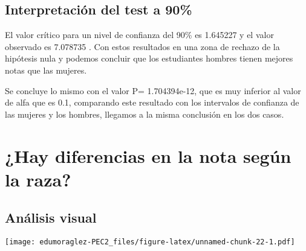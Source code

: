 \documentclass[
]{article}
\newenvironment{Shaded}{\begin{snugshade}}{\end{snugshade}}
\newcommand{\AttributeTok}[1]{\textcolor[rgb]{0.80,0.80,0.80}{#1}}
\newcommand{\ConstantTok}[1]{\textcolor[rgb]{0.86,0.64,0.64}{\textbf{#1}}}
\newcommand{\FunctionTok}[1]{\textcolor[rgb]{0.94,0.94,0.56}{#1}}
\newcommand{\NormalTok}[1]{\textcolor[rgb]{0.80,0.80,0.80}{#1}}
\newcommand{\OtherTok}[1]{\textcolor[rgb]{0.94,0.94,0.56}{#1}}
\newcommand{\SpecialCharTok}[1]{\textcolor[rgb]{0.86,0.64,0.64}{#1}}
\newcommand{\StringTok}[1]{\textcolor[rgb]{0.80,0.58,0.58}{#1}}
\begin{document}
\hypertarget{interpretaciuxf3n-del-test-a-90}{%
\subsection{Interpretación del test a
90\%}\label{interpretaciuxf3n-del-test-a-90}}

El valor crítico para un nivel de confianza del 90\% es 1.645227 y el
valor observado es 7.078735 . Con estos resultados en una zona de
rechazo de la hipótesis nula y podemos concluir que los estudiantes
hombres tienen mejores notas que las mujeres.

Se concluye lo mismo con el valor P= 1.704394e-12, que es muy inferior
al valor de alfa que es 0.1, comparando este resultado con los
intervalos de confianza de las mujeres y los hombres, llegamos a la
misma conclusión en los dos casos.

\hypertarget{hay-diferencias-en-la-nota-seguxfan-la-raza}{%
\section{¿Hay diferencias en la nota según la
raza?}\label{hay-diferencias-en-la-nota-seguxfan-la-raza}}

\hypertarget{anuxe1lisis-visual-2}{%
\subsection{Análisis visual}\label{anuxe1lisis-visual-2}}

\begin{Shaded}
\end{Shaded}

\texttt{[image: edumoraglez-PEC2\_files/figure-latex/unnamed-chunk-22-1.pdf]}
\end{document}
